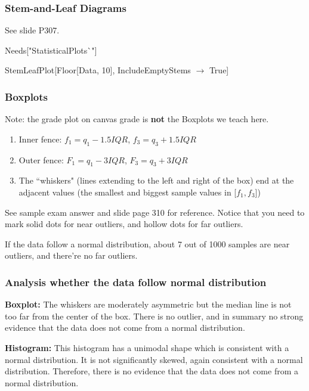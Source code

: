 \documentclass{beamer}
\begin{document}
\begin{frame}
    \frametitle{Stem-and-Leaf Diagrams}
    See slide P307.\par
    \vspace{0.3cm}
    
    Needs["StatisticalPlots\`{}"]\par
    StemLeafPlot[Floor[Data, 10], IncludeEmptyStems $\rightarrow$ True]

\end{frame}

\begin{frame}
    \frametitle{Boxplots}

    Note: the grade plot on canvas grade is \textbf{not} the Boxplots we teach here.
    \begin{enumerate}
        \item Inner fence: $f_1=q_1-1.5 IQR$, $f_3=q_3+1.5 IQR$
        \item Outer fence: $F_1=q_1-3 IQR$, $F_3=q_3+3 IQR$
        \item The ``whiskers" (lines extending to the left and right of the box) end at the adjacent values (the smallest and biggest sample values in [$f_1,f_3$])
    \end{enumerate}
    See sample exam answer and slide page 310 for reference. Notice that you need to mark solid dots for near outliers, and hollow dots for far outliers.\par
    If the data follow a normal distribution, about 7 out of 1000 samples are near outliers, and there're no far outliers.

\end{frame}

\begin{frame}
    \frametitle{Analysis whether the data follow normal distribution}

    \textbf{Boxplot:} The whiskers are moderately asymmetric but the median line is not too far from the center of the
    box. There is no outlier, and in summary no strong evidence that the data does
    not come from a normal distribution. \par
    \vspace{0.3cm}
    \textbf{Histogram:} This histogram has a unimodal shape which is consistent with a normal distribution. It is not significantly skewed, again consistent with a normal distribution. Therefore, there is no evidence that the data does not come from a normal distribution. 
    
\end{frame}
\end{document}
